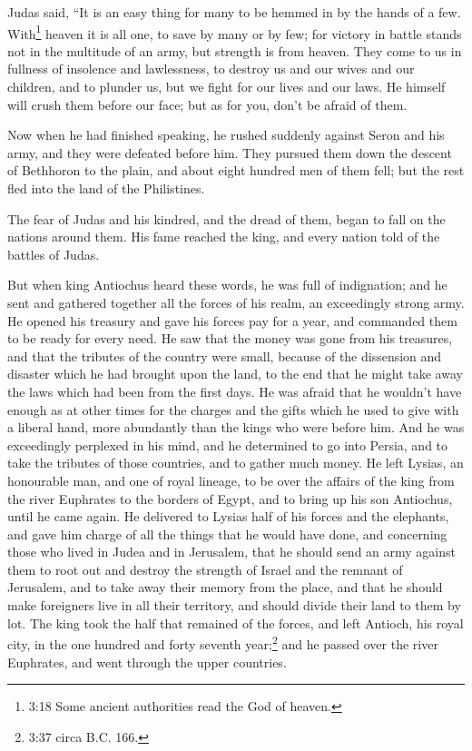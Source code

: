  Judas said, ``It is an easy thing for many to be hemmed in
by the hands of a few. With\footnote{3:18 Some ancient authorities read
  the God of heaven.} heaven it is all one, to save by many or by few;
 for victory in battle stands not in the multitude of an
army, but strength is from heaven.  They come to us in
fullness of insolence and lawlessness, to destroy us and our wives and
our children, and to plunder us,  but we fight for our
lives and our laws.  He himself will crush them before our
face; but as for you, don't be afraid of them.

 Now when he had finished speaking, he rushed suddenly
against Seron and his army, and they were defeated before him.
 They pursued them down the descent of Bethhoron to the
plain, and about eight hundred men of them fell; but the rest fled into
the land of the Philistines.

 The fear of Judas and his kindred, and the dread of them,
began to fall on the nations around them.  His fame reached
the king, and every nation told of the battles of Judas.

 But when king Antiochus heard these words, he was full of
indignation; and he sent and gathered together all the forces of his
realm, an exceedingly strong army.  He opened his treasury
and gave his forces pay for a year, and commanded them to be ready for
every need.  He saw that the money was gone from his
treasures, and that the tributes of the country were small, because of
the dissension and disaster which he had brought upon the land, to the
end that he might take away the laws which had been from the first days.
 He was afraid that he wouldn't have enough as at other
times for the charges and the gifts which he used to give with a liberal
hand, more abundantly than the kings who were before him. 
And he was exceedingly perplexed in his mind, and he determined to go
into Persia, and to take the tributes of those countries, and to gather
much money.  He left Lysias, an honourable man, and one of
royal lineage, to be over the affairs of the king from the river
Euphrates to the borders of Egypt,  and to bring up his son
Antiochus, until he came again.  He delivered to Lysias
half of his forces and the elephants, and gave him charge of all the
things that he would have done, and concerning those who lived in Judea
and in Jerusalem,  that he should send an army against them
to root out and destroy the strength of Israel and the remnant of
Jerusalem, and to take away their memory from the place, 
and that he should make foreigners live in all their territory, and
should divide their land to them by lot.  The king took the
half that remained of the forces, and left Antioch, his royal city, in
the one hundred and forty seventh year;\footnote{3:37 circa B.C. 166.}
and he passed over the river Euphrates, and went through the upper
countries.

